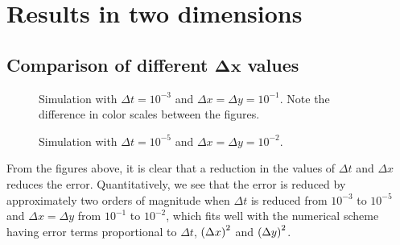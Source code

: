 \section{Results in two dimensions}

\subsection{Comparison of different \(\boldsymbol{\Delta x}\) values}

\begin{figure}[H]

\caption{Simulation with \(\Delta t = 10^{-3}\) and \(\Delta x = \Delta y = 10^{-1}\). Note the difference in color scales between the figures.}
\end{figure}

\begin{figure}[H]

\caption{Simulation with \(\Delta t = 10^{-5}\) and \(\Delta x = \Delta y = 10^{-2}\).}
\end{figure}

From the figures above, it is clear that a reduction in the values of \(\Delta t\) and \(\Delta x\) reduces the error. Quantitatively, we see that the error is reduced by approximately two orders of magnitude when \(\Delta t\) is reduced from \(10^{-3}\) to \(10^{-5}\) and \(\Delta x = \Delta y\) from \(10^{-1}\) to \(10^{-2}\), which fits well with the numerical scheme having error terms proportional to \(\Delta t\), \(\qty(\Delta x)^2\) and \(\qty(\Delta y)^2\).
